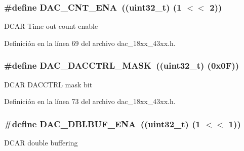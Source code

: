 \subsubsection[{\texorpdfstring{D\+A\+C\+\_\+\+C\+N\+T\+\_\+\+E\+NA}{DAC_CNT_ENA}}]{\setlength{\rightskip}{0pt plus 5cm}\#define D\+A\+C\+\_\+\+C\+N\+T\+\_\+\+E\+NA~((uint32\+\_\+t) (1 $<$$<$ 2))}\hypertarget{group___d_a_c__18_x_x__43_x_x_gae7c63d487a239e6abaf2bfdced3c67e4}{}\label{group___d_a_c__18_x_x__43_x_x_gae7c63d487a239e6abaf2bfdced3c67e4}
D\+C\+AR Time out count enable 

Definición en la línea 69 del archivo dac\+\_\+18xx\+\_\+43xx.\+h.

\subsubsection[{\texorpdfstring{D\+A\+C\+\_\+\+D\+A\+C\+C\+T\+R\+L\+\_\+\+M\+A\+SK}{DAC_DACCTRL_MASK}}]{\setlength{\rightskip}{0pt plus 5cm}\#define D\+A\+C\+\_\+\+D\+A\+C\+C\+T\+R\+L\+\_\+\+M\+A\+SK~((uint32\+\_\+t) (0x0\+F))}\hypertarget{group___d_a_c__18_x_x__43_x_x_ga3d9ce4bc003bffdea6fb98da402d2318}{}\label{group___d_a_c__18_x_x__43_x_x_ga3d9ce4bc003bffdea6fb98da402d2318}
D\+C\+AR D\+A\+C\+C\+T\+RL mask bit 

Definición en la línea 73 del archivo dac\+\_\+18xx\+\_\+43xx.\+h.

\subsubsection[{\texorpdfstring{D\+A\+C\+\_\+\+D\+B\+L\+B\+U\+F\+\_\+\+E\+NA}{DAC_DBLBUF_ENA}}]{\setlength{\rightskip}{0pt plus 5cm}\#define D\+A\+C\+\_\+\+D\+B\+L\+B\+U\+F\+\_\+\+E\+NA~((uint32\+\_\+t) (1 $<$$<$ 1))}\hypertarget{group___d_a_c__18_x_x__43_x_x_gaa52ab08dc967f09afb7fcbb15ef1b1c0}{}\label{group___d_a_c__18_x_x__43_x_x_gaa52ab08dc967f09afb7fcbb15ef1b1c0}
D\+C\+AR double buffering 

